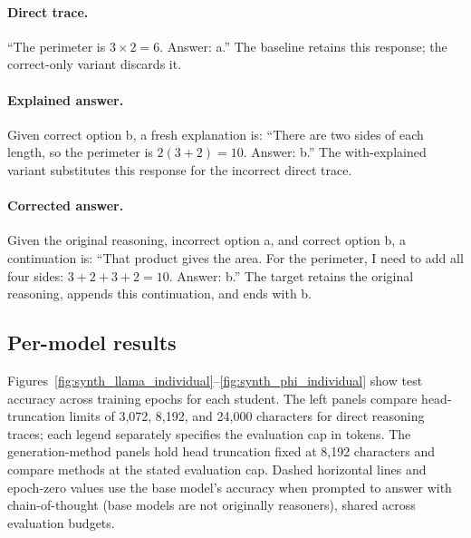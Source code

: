 \documentclass[11pt]{article}
\begin{document}
\paragraph{Direct trace.}
``The perimeter is $3\times2=6$. Answer: a.'' The baseline retains this response; the correct-only variant discards it.

\paragraph{Explained answer.}
Given correct option b, a fresh explanation is: ``There are two sides of each length, so the perimeter is $2(3+2)=10$. Answer: b.'' The with-explained variant substitutes this response for the incorrect direct trace.

\paragraph{Corrected answer.}
Given the original reasoning, incorrect option a, and correct option b, a continuation is: ``That product gives the area. For the perimeter, I need to add all four sides: $3+2+3+2=10$. Answer: b.'' The target retains the original reasoning, appends this continuation, and ends with b.

\subsection{Per-model results}
\label{sec:synth_per_model}
Figures~\ref{fig:synth_llama_individual}--\ref{fig:synth_phi_individual} show test accuracy across training epochs for each student. The left panels compare head-truncation limits of 3,072, 8,192, and 24,000 characters for direct reasoning traces; each legend separately specifies the evaluation cap in tokens. The generation-method panels hold head truncation fixed at 8,192 characters and compare methods at the stated evaluation cap. Dashed horizontal lines and epoch-zero values use the base model's accuracy when prompted to answer with chain-of-thought (base models are not originally reasoners), shared across evaluation budgets.
\end{document}
